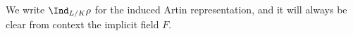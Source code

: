 \begin{notn}
We write $\Ind_{L/K}\rho$ for the induced Artin representation, and it will always be clear from context the implicit field $F$.
\end{notn}

